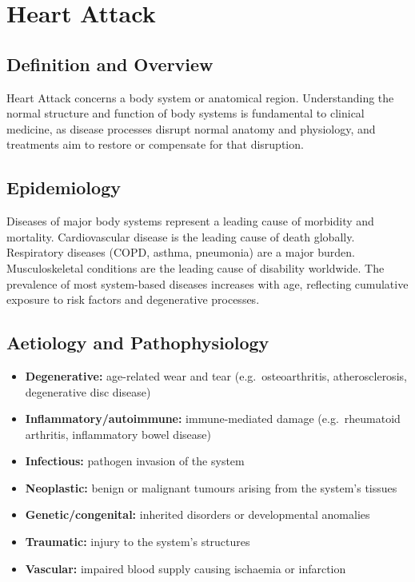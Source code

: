 \chapter{Heart Attack}

\section*{Definition and Overview}
Heart Attack concerns a body system or anatomical region. Understanding the normal structure and function of body systems is fundamental to clinical medicine, as disease processes disrupt normal anatomy and physiology, and treatments aim to restore or compensate for that disruption.

\section*{Epidemiology}
Diseases of major body systems represent a leading cause of morbidity and mortality. Cardiovascular disease is the leading cause of death globally. Respiratory diseases (COPD, asthma, pneumonia) are a major burden. Musculoskeletal conditions are the leading cause of disability worldwide. The prevalence of most system-based diseases increases with age, reflecting cumulative exposure to risk factors and degenerative processes.

\section*{Aetiology and Pathophysiology}
\begin{itemize}
    \item \textbf{Degenerative:} age-related wear and tear (e.g.\ osteoarthritis, atherosclerosis, degenerative disc disease)
    \item \textbf{Inflammatory/autoimmune:} immune-mediated damage (e.g.\ rheumatoid arthritis, inflammatory bowel disease)
    \item \textbf{Infectious:} pathogen invasion of the system
    \item \textbf{Neoplastic:} benign or malignant tumours arising from the system's tissues
    \item \textbf{Genetic/congenital:} inherited disorders or developmental anomalies
    \item \textbf{Traumatic:} injury to the system's structures
    \item \textbf{Vascular:} impaired blood supply causing ischaemia or infarction
\end{itemize}

